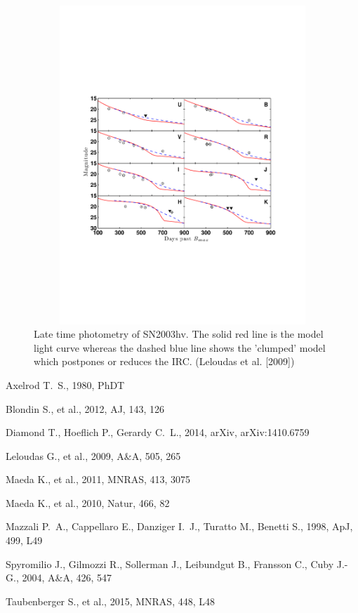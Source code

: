 \documentclass[11pt]{article}
\begin{document}
\begin{figure}
\includegraphics[width=150mm, height = 120mm]{../Leloudas2003hv_fg9.pdf}
\caption{Late time photometry of SN2003hv. The solid red line is the model light curve whereas the dashed blue line shows the 'clumped' model which postpones or reduces the IRC. (Leloudas et al. [2009]) }
\label{fig:l09}
\end{figure}
\fi
\begin{thebibliography}{99}
Axelrod T.~S., 1980, PhDT 

 Blondin S., et al., 2012, AJ, 143, 126 

 Diamond T., Hoeflich P., Gerardy C.~L., 2014, arXiv, arXiv:1410.6759 

 Leloudas G., et al., 2009, A\&A, 505, 265 

Maeda K., et al., 2011, MNRAS, 413, 3075 

Maeda K., et al., 2010, Natur, 466, 82 

 Mazzali P.~A., Cappellaro E., Danziger 
I.~J., Turatto M., Benetti S., 1998, ApJ, 499, L49 


 Spyromilio J., Gilmozzi R., Sollerman J., Leibundgut B., Fransson C., Cuby J.-G., 2004, A\&A, 426, 547 


 Taubenberger S., et al., 2015, MNRAS, 448, 
L48 


\end{thebibliography}
\end{document}
